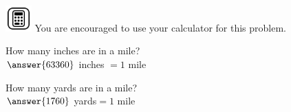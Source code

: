 \documentclass{ximera}
\author{David Kish}
\begin{document}
\includegraphics[width=1cm]{calc.PNG} You are encouraged to use your calculator for this problem.
\begin{exercise}
How many inches are in a mile? \\
$\answer{63360}$ inches $= 1$ mile 
\end{exercise}
 \begin{exercise}
 How many yards are in a mile? \\
 $\answer{1760}$ yards$ = 1$ mile
 \end{exercise}
\end{document}
